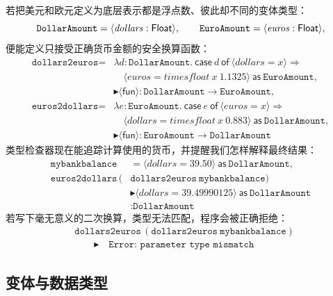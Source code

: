 若把美元和欧元定义为底层表示都是浮点数、彼此却不同的变体类型：
\[
\texttt{DollarAmount}=\langle\mathit{dollars}:\mathsf{Float}\rangle,
\qquad
\texttt{EuroAmount}=\langle\mathit{euros}:\mathsf{Float}\rangle,
\]
便能定义只接受正确货币金额的安全换算函数：
\[
\begin{aligned}
\texttt{dollars2euros}={}&\lambda d:\texttt{DollarAmount}.\
\mathsf{case}\ d\ \mathsf{of}\
\langle\mathit{dollars}=x\rangle\Rightarrow\\
&\quad\langle\mathit{euros}=\mathit{timesfloat}\ x\ 1.1325\rangle\
\mathsf{as}\ \texttt{EuroAmount},\\[-1pt]
&\blacktriangleright
\langle\mathsf{fun}\rangle:
\texttt{DollarAmount}\to\texttt{EuroAmount},\\[3pt]
\texttt{euros2dollars}={}&\lambda e:\texttt{EuroAmount}.\
\mathsf{case}\ e\ \mathsf{of}\
\langle\mathit{euros}=x\rangle\Rightarrow\\
&\quad\langle\mathit{dollars}=\mathit{timesfloat}\ x\ 0.883\rangle\
\mathsf{as}\ \texttt{DollarAmount},\\[-1pt]
&\blacktriangleright
\langle\mathsf{fun}\rangle:
\texttt{EuroAmount}\to\texttt{DollarAmount}
\end{aligned}
\]
类型检查器现在能追踪计算使用的货币，并提醒我们怎样解释最终结果：
\[
\begin{aligned}
\texttt{mybankbalance}
 &=\langle\mathit{dollars}=39.50\rangle\
   \mathsf{as}\ \texttt{DollarAmount},\\
\texttt{euros2dollars}\,
  (&\texttt{dollars2euros}\ \texttt{mybankbalance})\\
&\blacktriangleright
\langle\mathit{dollars}=39.49990125\rangle\
\mathsf{as}\ \texttt{DollarAmount}\\
&:\texttt{DollarAmount}
\end{aligned}
\]
若写下毫无意义的二次换算，类型无法匹配，程序会被正确拒绝：
\[
\begin{aligned}
&\texttt{dollars2euros}\,
  (\texttt{dollars2euros}\ \texttt{mybankbalance})\\
&\qquad\blacktriangleright\quad
  \texttt{Error: parameter type mismatch}
\end{aligned}
\]

\subsection*{变体与数据类型}

